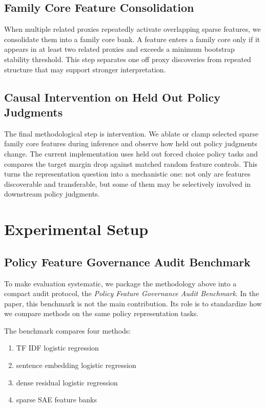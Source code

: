 ﻿\documentclass{article}
\begin{document}
\subsection{Family Core Feature Consolidation}
When multiple related proxies repeatedly activate overlapping sparse features, we consolidate them into a family core bank. A feature enters a family core only if it appears in at least two related proxies and exceeds a minimum bootstrap stability threshold. This step separates one off proxy discoveries from repeated structure that may support stronger interpretation.

\subsection{Causal Intervention on Held Out Policy Judgments}
The final methodological step is intervention. We ablate or clamp selected sparse family core features during inference and observe how held out policy judgments change. The current implementation uses held out forced choice policy tasks and compares the target margin drop against matched random feature controls. This turns the representation question into a mechanistic one: not only are features discoverable and transferable, but some of them may be selectively involved in downstream policy judgments.

\section{Experimental Setup}
\subsection{Policy Feature Governance Audit Benchmark}
To make evaluation systematic, we package the methodology above into a compact audit protocol, the \emph{Policy Feature Governance Audit Benchmark}. In the paper, this benchmark is not the main contribution. Its role is to standardize how we compare methods on the same policy representation tasks.

The benchmark compares four methods:
\begin{enumerate}
    \item TF IDF logistic regression
    \item sentence embedding logistic regression
    \item dense residual logistic regression
    \item sparse SAE feature banks
\end{enumerate}
\end{document}
